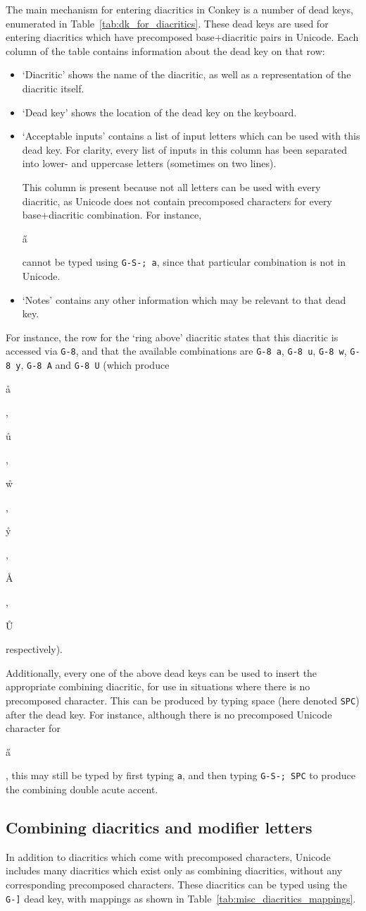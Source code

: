 \documentclass[oneside]{memoir}
\newcommand{\key}{\verb}
\newcommand{\out}[1]{\colorbox{gray!20}{\strut{}#1}}
\begin{document}
The main mechanism for entering diacritics in Conkey is a number of dead keys,
  enumerated in Table~\ref{tab:dk_for_diacritics}.
These dead keys are used for entering diacritics which have precomposed base+diacritic pairs in Unicode.
Each column of the table contains information about the dead key on that row:
\begin{itemize}
\item `Diacritic' shows the name of the diacritic, as well as a representation of the diacritic itself.
\item `Dead key' shows the location of the dead key on the keyboard.
\item `Acceptable inputs' contains a list of input letters which can be used with this dead key.
  For clarity, every list of inputs in this column has been separated into lower- and uppercase letters (sometimes on two lines).

  This column is present because not all letters can be used with every diacritic,
    as Unicode does not contain precomposed characters for every base+diacritic combination.
  For instance, \out{a̋} cannot be typed using \key|G-S-; a|, since that particular combination is not in Unicode.
\item `Notes' contains any other information which may be relevant to that dead key.
\end{itemize}
For instance, the row for the `ring above' diacritic states that this diacritic is accessed via \key|G-8|,
  and that the available combinations are \key|G-8 a|, \key|G-8 u|, \key|G-8 w|, \key|G-8 y|, \key|G-8 A| and \key|G-8 U|
  (which produce \out{å}, \out{ů}, \out{ẘ}, \out{ẙ}, \out{Å}, \out{Ů} respectively).

Additionally, every one of the above dead keys can be used to insert the appropriate combining diacritic,
  for use in situations where there is no precomposed character.
This can be produced by typing space (here denoted \key|SPC|) after the dead key.
For instance, although there is no precomposed Unicode character for \out{a̋},
  this may still be typed by first typing \key|a|, and then typing \key|G-S-; SPC| to produce the combining double acute accent.


\subsection{Combining diacritics and modifier letters}
\label{sec:combining_diacritics}

In addition to diacritics which come with precomposed characters, Unicode includes many diacritics which exist only as combining diacritics,
  without any corresponding precomposed characters.
These diacritics can be typed using the \key|G-]| dead key, with mappings as shown in Table~\ref{tab:misc_diacritics_mappings}.
\end{document}
